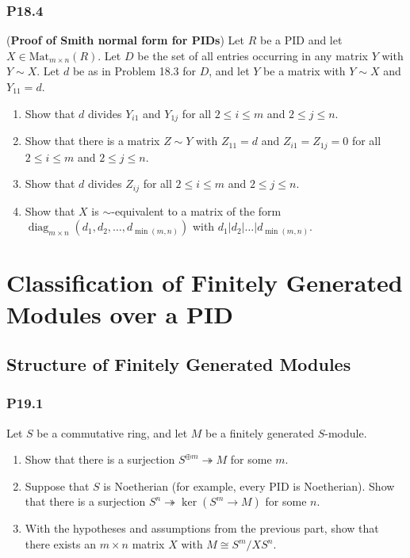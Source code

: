 \documentclass[lang=cn,11pt]{template}
\begin{document}
\subsection*{P18.4} (\textbf{Proof of Smith normal form for PIDs}) Let \( R \) be a PID and let \( X \in \text{Mat}_{m \times n}(R) \). Let \( D \) be the set of all entries occurring in any matrix \( Y \) with \( Y \sim X \). Let \( d \) be as in Problem 18.3 for \( D \), and let \( Y \) be a matrix with \( Y \sim X \) and \( Y_{11} = d \).
\begin{enumerate}
    \item Show that \( d \) divides \( Y_{i1} \) and \( Y_{1j} \) for all \( 2 \leq i \leq m \) and \( 2 \leq j \leq n \).
    \item Show that there is a matrix \( Z \sim Y \) with \( Z_{11} = d \) and \( Z_{i1} = Z_{1j} = 0 \) for all \( 2 \leq i \leq m \) and \( 2 \leq j \leq n \).
    \item Show that \( d \) divides \( Z_{ij} \) for all \( 2 \leq i \leq m \) and \( 2 \leq j \leq n \).
    \item Show that \( X \) is \( \sim \)-equivalent to a matrix of the form \( \operatorname{diag}_{m \times n}(d_1, d_2, \dots, d_{\min(m,n)}) \) with \( d_1 | d_2 | \dots | d_{\min(m,n)} \).
\end{enumerate}










\chapter{Classification of Finitely Generated Modules over a PID}

\section{Structure of Finitely Generated Modules}

\subsection*{P19.1} Let \( S \) be a commutative ring, and let \( M \) be a finitely generated \( S \)-module.
\begin{enumerate}
    \item Show that there is a surjection \( S^{\oplus m} \twoheadrightarrow M \) for some \( m \).
    \item Suppose that \( S \) is Noetherian (for example, every PID is Noetherian). Show that there is a surjection \( S^n \twoheadrightarrow \ker(S^m \to M) \) for some \( n \).
    \item With the hypotheses and assumptions from the previous part, show that there exists an \( m \times n \) matrix \( X \) with \( M \cong S^m / X S^n \).
\end{enumerate}
\end{document}
